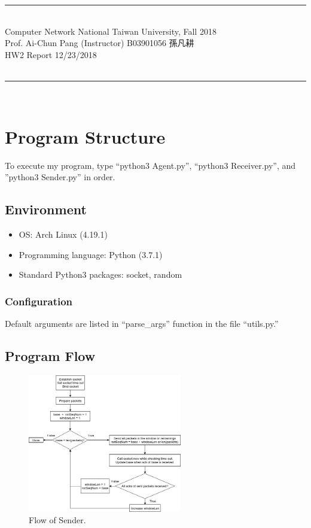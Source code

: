 \documentclass{article}
\begin{document}
{\bf \noindent
\rule[3pt]{\textwidth}{0.3pt}\\
Computer Network \hfill National Taiwan University, Fall 2018 \\
Prof. Ai-Chun Pang (Instructor) \hfill B03901056 孫凡耕 \\
HW2 Report \hfill 12/23/2018 \\
\vspace{-14pt} \\
\rule[3pt]{\textwidth}{1.3pt}\\
[-1cm]
}


\section{Program Structure}

To execute my program, type ``python3 Agent.py'', ``python3 Receiver.py'', and ''python3 Sender.py'' in order.

\subsection{Environment}
\begin{itemize}
  \item OS: Arch Linux (4.19.1)
  \item Programming language: Python (3.7.1)
  \item Standard Python3 packages: socket, random
\end{itemize}

\subsubsection{Configuration}
Default arguments are listed in ``parse\_args'' function in the file ``utils.py.''

\subsection{Program Flow}
\begin{figure}[h]
 \centering
 \includegraphics[width=0.6\textwidth]{Sender.png}
 \caption{Flow of Sender.}
\end{figure}
\end{document}

